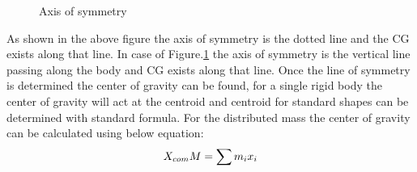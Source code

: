 \documentclass[12pt]{article}
\begin{document}
\begin{figure}[h]
	\centering
	\hspace{1cm}
	\caption{Axis of symmetry}
    \label{fig:Axis of symmetry}
\end{figure}
As shown in the above figure the axis of symmetry is the dotted line and the CG exists
along that line. In case of Figure.\ref{fig:Axis of symmetry} the axis of symmetry is the vertical line passing along the
body and CG exists along that line. Once the line of symmetry is determined the center of
gravity can be found, for a single rigid body the center of gravity will act at the centroid
and centroid for standard shapes can be determined with standard formula. For the
distributed mass the center of gravity can be calculated using below equation:
\begin{equation}
\centering
	X_{com}M = \sum{m_{i} x_{i}} 
	\label{equ: Com}
\end{equation}
 
\end{document}
